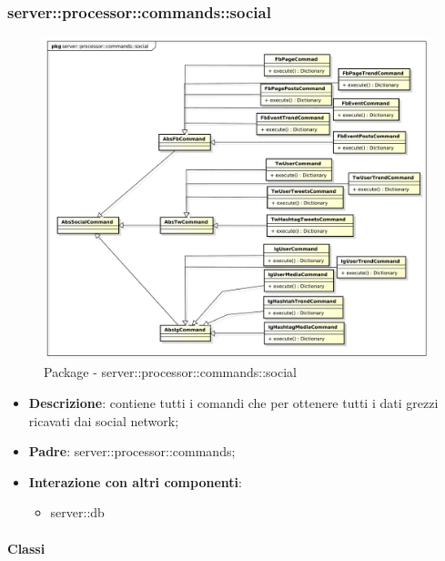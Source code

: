       \subsubsection{server::processor::commands::social} %
      \label{ssub:bdsm_app_server_processor_commands_social}
      \begin{figure}[!htbp]
        \centering
        \centerline{\includegraphics[scale=0.4]{./images/server/social.pdf}}
        \caption{Package - server::processor::commands::social}
      \end{figure}

      \begin{itemize}
        \item \textbf{Descrizione}: contiene tutti i comandi che per ottenere tutti i dati grezzi ricavati dai social network;
        \item \textbf{Padre}: server::processor::commands;
        \item \textbf{Interazione con altri componenti}:
          \begin{itemize}
            \item server::db
          \end{itemize}
      \end{itemize}

        \paragraph{Classi} %

